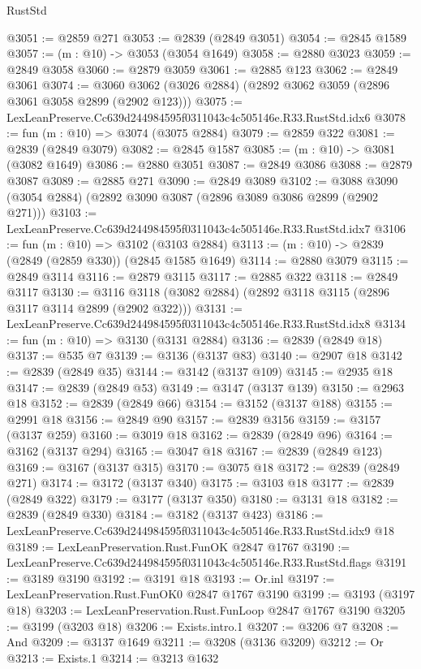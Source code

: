\begin{lexlean}{RustStd}
\begin{coremodule}
@3051 := @2859 @271
@3053 := @2839 (@2849 @3051)
@3054 := @2845 @1589
@3057 := (m : @10) -> @3053 (@3054 @1649)
@3058 := @2880 @3023
@3059 := @2849 @3058
@3060 := @2879 @3059
@3061 := @2885 @123
@3062 := @2849 @3061
@3074 := @3060 @3062 (@3026 @2884) (@2892 @3062 @3059 (@2896 @3061 @3058 @2899 (@2902 @123)))
@3075 := LexLeanPreserve.Cc639d244984595f0311043c4c505146e.R33.RustStd.idx6
@3078 := fun (m : @10) => @3074 (@3075 @2884)
@3079 := @2859 @322
@3081 := @2839 (@2849 @3079)
@3082 := @2845 @1587
@3085 := (m : @10) -> @3081 (@3082 @1649)
@3086 := @2880 @3051
@3087 := @2849 @3086
@3088 := @2879 @3087
@3089 := @2885 @271
@3090 := @2849 @3089
@3102 := @3088 @3090 (@3054 @2884) (@2892 @3090 @3087 (@2896 @3089 @3086 @2899 (@2902 @271)))
@3103 := LexLeanPreserve.Cc639d244984595f0311043c4c505146e.R33.RustStd.idx7
@3106 := fun (m : @10) => @3102 (@3103 @2884)
@3113 := (m : @10) -> @2839 (@2849 (@2859 @330)) (@2845 @1585 @1649)
@3114 := @2880 @3079
@3115 := @2849 @3114
@3116 := @2879 @3115
@3117 := @2885 @322
@3118 := @2849 @3117
@3130 := @3116 @3118 (@3082 @2884) (@2892 @3118 @3115 (@2896 @3117 @3114 @2899 (@2902 @322)))
@3131 := LexLeanPreserve.Cc639d244984595f0311043c4c505146e.R33.RustStd.idx8
@3134 := fun (m : @10) => @3130 (@3131 @2884)
@3136 := @2839 (@2849 @18)
@3137 := @535 @7
@3139 := @3136 (@3137 @83)
@3140 := @2907 @18
@3142 := @2839 (@2849 @35)
@3144 := @3142 (@3137 @109)
@3145 := @2935 @18
@3147 := @2839 (@2849 @53)
@3149 := @3147 (@3137 @139)
@3150 := @2963 @18
@3152 := @2839 (@2849 @66)
@3154 := @3152 (@3137 @188)
@3155 := @2991 @18
@3156 := @2849 @90
@3157 := @2839 @3156
@3159 := @3157 (@3137 @259)
@3160 := @3019 @18
@3162 := @2839 (@2849 @96)
@3164 := @3162 (@3137 @294)
@3165 := @3047 @18
@3167 := @2839 (@2849 @123)
@3169 := @3167 (@3137 @315)
@3170 := @3075 @18
@3172 := @2839 (@2849 @271)
@3174 := @3172 (@3137 @340)
@3175 := @3103 @18
@3177 := @2839 (@2849 @322)
@3179 := @3177 (@3137 @350)
@3180 := @3131 @18
@3182 := @2839 (@2849 @330)
@3184 := @3182 (@3137 @423)
@3186 := LexLeanPreserve.Cc639d244984595f0311043c4c505146e.R33.RustStd.idx9 @18
@3189 := LexLeanPreservation.Rust.FunOK @2847 @1767
@3190 := LexLeanPreserve.Cc639d244984595f0311043c4c505146e.R33.RustStd.flags
@3191 := @3189 @3190
@3192 := @3191 @18
@3193 := Or.inl
@3197 := LexLeanPreservation.Rust.FunOK0 @2847 @1767 @3190
@3199 := @3193 (@3197 @18)
@3203 := LexLeanPreservation.Rust.FunLoop @2847 @1767 @3190
@3205 := @3199 (@3203 @18)
@3206 := Exists.intro.{1}
@3207 := @3206 @7
@3208 := And
@3209 := @3137 @1649
@3211 := @3208 (@3136 @3209)
@3212 := Or
@3213 := Exists.{1}
@3214 := @3213 @1632

\end{coremodule}
\end{lexlean}
